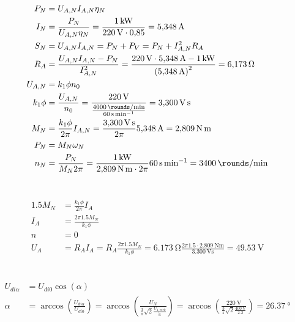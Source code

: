 \documentclass[11pt,a4paper]{scrartcl}
\newcommand{\mybr}[1]{\left(#1\right)}
\newcommand{\0}{_{\mybr{0}}}
\newcommand{\1}{_{\mybr{1}}}
\newcommand{\2}{_{\mybr{2}}}
\begin{document}
\section{}
\begin{align}
P_N&=U_{A,N} I_{A,N} \eta_N\\
I_N&=\frac{P_N}{U_{A,N}\eta_N}=\frac{\SI{1}{\kilo\watt}}{\SI{220}{\volt}\cdot\num{0.85}}=\SI{5.348}{\ampere}\\
S_N&=U_{A,N}I_{A,N}=P_N+P_V=P_N+I_{A,N}^2 R_A\\
R_A&=\frac{U_{A,N}I_{A,N}-P_N}{I_{A,N}^2}=\frac{\SI{220}{\volt}\cdot\SI{5.348}{\ampere}-\SI{1}{\kilo\watt}}{\mybr{\SI{5.348}{\ampere}}^2}=\SI{6.173}{\ohm}\\
U_{A,N}&=k_1\phi n_0\\
k_1\phi&=\frac{U_{A,N}}{n_0}=\frac{\SI{220}{\volt}}{\frac{\SI{4000}{\rounds\per\minute}}{\SI{60}{\second\per\minute}}}=\SI{3.300}{\volt\second}\\
M_N&=\frac{k_1\phi}{2\pi}I_{A,N}=\frac{\SI{3.300}{\volt\second}}{2\pi}\SI{5.348}{\ampere}=\SI{2.809}{\newton\metre}\\
P_N&=M_N\omega_N\\
n_N&=\frac{P_N}{M_N 2\pi}=\frac{\SI{1}{\kilo\watt}}{\SI{2.809}{\newton\metre}\cdot 2 \pi}\SI{60}{\second\per\minute}=\SI{3400}{\rounds\per\minute}
\end{align}

\section{}
\begin{align}
\num{1.5}M_N&=\frac{k_1\phi}{2\pi}I_A\\
I_A&=\frac{2\pi\num{1.5}M_N}{k_1\phi}\\
n&=0\\
U_A&=R_A I_A=R_A \frac{2\pi\num{1.5}M_N}{k_1\phi}=\SI{6.173}{\ohm}\frac{2\pi\num{1.5}\cdot\SI{2.809}{\newton\metre}}{\SI{3.300}{\volt\second}}=\SI{49.53}{\volt}
\end{align}

\section{}
\begin{align}
U_{di\alpha}&=U_{di0}\cos\mybr{\alpha}\\
\alpha&=\arccos\mybr{\frac{U_{di\alpha}}{U_{di0}}}=\arccos\mybr{\frac{U_N}{\frac{3}{\pi}\sqrt{2}\frac{U_{1,verk}}{\ddot{u}}}}=\arccos\mybr{\frac{\SI{220}{\volt}}{\frac{3}{\pi}\sqrt{2}\frac{\SI{400}{\volt}}{\num{2.2}}}}=\SI{26.37}{\degree}
\end{align}
\end{document}
